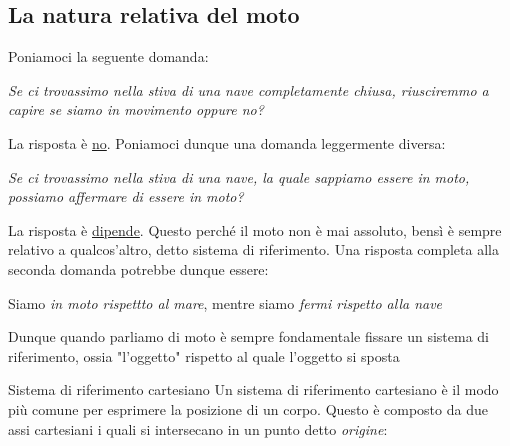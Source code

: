 \subsection{La natura relativa del moto}
Poniamoci la seguente domanda:
\begin{center}
	\textit{Se ci trovassimo nella stiva di una nave completamente chiusa, riusciremmo a capire se siamo in movimento oppure no?}
\end{center}
La risposta è \underline{no}. Poniamoci dunque una domanda leggermente diversa:
\begin{center}
	\textit{Se ci trovassimo nella stiva di una nave, la quale sappiamo essere in moto, possiamo affermare di essere in moto?}
\end{center}
La risposta è \underline{dipende}. Questo perché il moto non è mai assoluto, bensì è sempre relativo a qualcos'altro, detto sistema di riferimento. Una risposta completa alla seconda domanda potrebbe dunque essere:
\begin{center}
	Siamo \textit{in moto rispettto al mare}, mentre siamo \textit{fermi rispetto alla nave}
\end{center}
Dunque quando parliamo di moto è sempre fondamentale fissare un sistema di riferimento, ossia "l'oggetto" rispetto al quale l'oggetto si sposta

\begin{definizione}{Sistema di riferimento cartesiano}
	Un sistema di riferimento cartesiano è il modo più comune per esprimere la posizione di un corpo. Questo è composto da due assi cartesiani i quali si intersecano in un punto detto \textit{origine}:
\end{definizione}
